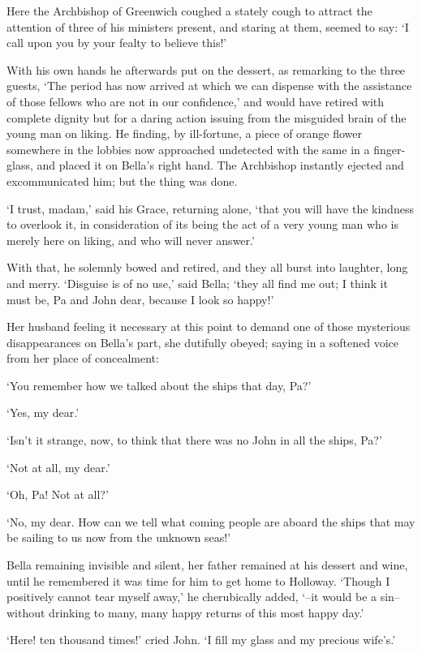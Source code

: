 Here the Archbishop of Greenwich coughed a stately cough to attract the
attention of three of his ministers present, and staring at them, seemed
to say: ‘I call upon you by your fealty to believe this!’

With his own hands he afterwards put on the dessert, as remarking to the
three guests, ‘The period has now arrived at which we can dispense with
the assistance of those fellows who are not in our confidence,’ and
would have retired with complete dignity but for a daring action issuing
from the misguided brain of the young man on liking. He finding, by
ill-fortune, a piece of orange flower somewhere in the lobbies now
approached undetected with the same in a finger-glass, and placed it on
Bella’s right hand. The Archbishop instantly ejected and excommunicated
him; but the thing was done.

‘I trust, madam,’ said his Grace, returning alone, ‘that you will have
the kindness to overlook it, in consideration of its being the act of a
very young man who is merely here on liking, and who will never answer.’

With that, he solemnly bowed and retired, and they all burst into
laughter, long and merry. ‘Disguise is of no use,’ said Bella; ‘they
all find me out; I think it must be, Pa and John dear, because I look so
happy!’

Her husband feeling it necessary at this point to demand one of those
mysterious disappearances on Bella’s part, she dutifully obeyed; saying
in a softened voice from her place of concealment:

‘You remember how we talked about the ships that day, Pa?’

‘Yes, my dear.’

‘Isn’t it strange, now, to think that there was no John in all the
ships, Pa?’

‘Not at all, my dear.’

‘Oh, Pa! Not at all?’

‘No, my dear. How can we tell what coming people are aboard the ships
that may be sailing to us now from the unknown seas!’

Bella remaining invisible and silent, her father remained at his
dessert and wine, until he remembered it was time for him to get home to
Holloway. ‘Though I positively cannot tear myself away,’ he cherubically
added, ‘--it would be a sin--without drinking to many, many happy
returns of this most happy day.’

‘Here! ten thousand times!’ cried John. ‘I fill my glass and my precious
wife’s.’

